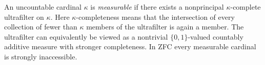 
An uncountable cardinal $\kappa$ is \emph{measurable} if there exists a nonprincipal $\kappa$-complete ultrafilter on $\kappa$. Here $\kappa$-completeness means that the intersection of every collection of fewer than $\kappa$ members of the ultrafilter is again a member. The ultrafilter can equivalently be viewed as a nontrivial $\{0,1\}$-valued countably additive measure with stronger completeness. In ZFC every measurable cardinal is strongly inaccessible.

